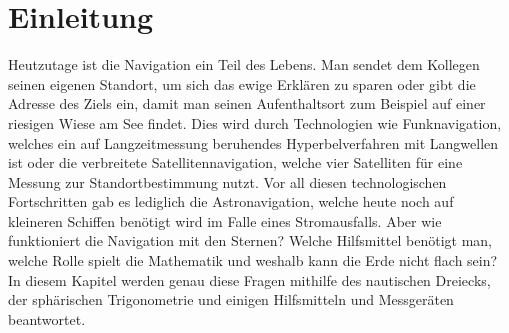 

\section{Einleitung}
Heutzutage ist die Navigation ein Teil des Lebens. 
Man sendet dem Kollegen seinen eigenen Standort, um sich das ewige Erklären zu sparen oder gibt die Adresse des Ziels ein, damit man seinen Aufenthaltsort zum Beispiel auf einer riesigen Wiese am See findet. 
Dies wird durch Technologien wie Funknavigation, welches ein auf Langzeitmessung beruhendes Hyperbelverfahren mit Langwellen ist oder die verbreitete Satellitennavigation, welche vier Satelliten für eine Messung zur Standortbestimmung nutzt.
Vor all diesen technologischen Fortschritten gab es lediglich die Astronavigation, welche heute noch auf kleineren Schiffen benötigt wird im Falle eines Stromausfalls. 
Aber wie funktioniert die Navigation mit den Sternen? Welche Hilfsmittel benötigt man, welche Rolle spielt die Mathematik und weshalb kann die Erde nicht flach sein? 
In diesem Kapitel werden genau diese Fragen mithilfe des nautischen Dreiecks, der sphärischen Trigonometrie und einigen Hilfsmitteln und Messgeräten beantwortet.